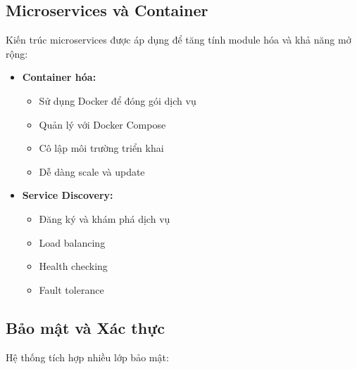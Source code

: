 \subsection{Microservices và Container}
\hspace{0.5cm}Kiến trúc microservices được áp dụng để tăng tính module hóa và khả năng mở rộng:

\begin{itemize}
    \item \textbf{Container hóa:}
    \begin{itemize}
        \item Sử dụng Docker để đóng gói dịch vụ
        \item Quản lý với Docker Compose
        \item Cô lập môi trường triển khai
        \item Dễ dàng scale và update
    \end{itemize}
    
    \item \textbf{Service Discovery:}
    \begin{itemize}
        \item Đăng ký và khám phá dịch vụ
        \item Load balancing
        \item Health checking
        \item Fault tolerance
    \end{itemize}
\end{itemize}

\subsection{Bảo mật và Xác thực}
\hspace{0.5cm}Hệ thống tích hợp nhiều lớp bảo mật:

